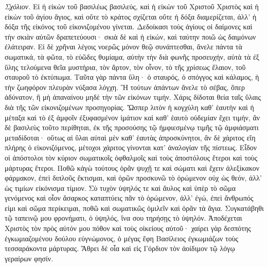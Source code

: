 \documentclass[10pt]{book}
\newcommand{\switchGreek}[1][]{\selectlanguage{polutonikogreek} \switchcolumn*[#1]}
\newcommand{\switchEnglish}{\selectlanguage{english} \switchcolumn}
\begin{document}
\begin{paracol}{2}
\switchGreek

\emph{Σχόλιον.} Εἰ ἡ εἰκὼν τοῦ βασιλέως βασιλεύς,
καὶ ἡ εἰκὼν τοῦ Χριστοῦ Χριστὸς
καὶ ἡ εἰκὼν τοῦ ἁγίου ἅγιος,
καὶ οὔτε τὸ κράτος σχίζεται οὔτε ἡ δόξα διαμερίζεται, ἀλλ’ ἡ
δόξα τῆς εἰκόνος τοῦ εἰκονιζομένου γίνεται. Δεδοίκασι τοὺς ἁγίους οἱ δαίμονες
καὶ τὴν σκιὰν αὐτῶν δραπετεύουσι· σκιὰ δὲ καὶ ἡ εἰκών, καὶ ταύτην ποιῶ ὡς
δαιμόνων ἐλάτειραν. Εἰ δὲ χρῆναι λέγοις νοερῶς μόνον θεῷ συνάπτεσθαι, ἄνελε
πάντα τὰ σωματικά, τὰ φῶτα, τὸ εὐῶδες θυμίαμα, αὐτὴν τὴν διὰ φωνῆς προσευχήν,
αὐτὰ τὰ ἐξ ὕλης τελούμενα θεῖα μυστήρια, τὸν ἄρτον, τὸν οἶνον, τὸ τῆς χρίσεως
ἔλαιον, τοῦ σταυροῦ τὸ ἐκτύπωμα. Ταῦτα γὰρ πάντα ὕλη· ὁ σταυρός, ὁ σπόγγος καὶ
κάλαμος, ἡ τὴν ζωηφόρον πλευρὰν νύξασα λόγχη. Ἢ τούτων ἁπάντων ἄνελε τὸ σέβας,
ὅπερ ἀδύνατον, ἢ μὴ ἀπαναίνου μηδὲ τὴν τῶν εἰκόνων τιμήν. Χάρις δίδοται θεία
ταῖς ὕλαις διὰ τῆς τῶν εἰκονιζομένων προσηγορίας. Ὥσπερ λιτὸν ἡ κογχύλη καθ’
ἑαυτὴν καὶ ἡ μέταξα καὶ τὸ ἐξ ἀμφοῖν ἐξυφασμένον ἱμάτιον καὶ καθ’ ἑαυτὸ
οὐδεμίαν ἔχει τιμήν, ἂν δὲ βασιλεὺς τοῦτο περίθηται, ἐκ τῆς προσούσης τῷ
ἠμφιεσμένῳ τιμῆς τῷ ἀμφιάσματι μεταδίδοται· οὕτως αἱ ὕλαι αὐταὶ μὲν καθ’
ἑαυτὰς ἀπροσκύνητοι, ἂν δὲ χάριτος εἴη πλήρης ὁ εἰκονιζόμενος, μέτοχοι χάριτος
γίνονται κατ’ ἀναλογίαν τῆς πίστεως. Εἶδον οἱ ἀπόστολοι τὸν κύριον σωματικοῖς
ὀφθαλμοῖς καὶ τοὺς ἀποστόλους ἕτεροι καὶ τοὺς μάρτυρας ἕτεροι. Ποθῶ κἀγὼ
τούτους ὁρᾶν ψυχῇ τε καὶ σώματι καὶ ἔχειν ἀλεξίκακον φάρμακον, ἐπεὶ διπλοῦς
ἔκτισμαι, καὶ ὁρῶν προσκυνῶ τὸ ὁρώμενον οὐχ ὡς θεόν, ἀλλ’ ὡς τιμίων εἰκόνισμα
τίμιον. Σὺ τυχὸν ὑψηλός τε καὶ ἄυλος καὶ ὑπὲρ τὸ σῶμα γενόμενος καὶ οἷον
ἄσαρκος καταπτύεις πᾶν τὸ ὁρώμενον, ἀλλ’ ἐγώ, ἐπεὶ ἄνθρωπός εἰμι καὶ σῶμα
περίκειμαι, ποθῶ καὶ σωματικῶς ὁμιλεῖν καὶ ὁρᾶν τὰ ἅγια. Συγκατάβηθι τῷ
ταπεινῷ μου φρονήματι, ὁ ὑψηλός, ἵνα σου τηρήσῃς τὸ ὑψηλόν. Ἀποδέχεται Χριστὸς
τὸν πρὸς αὐτόν μου πόθον καὶ τοὺς οἰκείους αὐτοῦ· χαίρει γὰρ δεσπότης
ἐγκωμιαζομένου δούλου εὐγνώμονος, ὁ μέγας ἔφη Βασίλειος ἐγκωμιάζων τοὺς
τεσσαράκοντα μάρτυρας. Ἄθρει δὲ οἷα καὶ εἰς Γόρδιον τὸν ἀοίδιμον τῷ λόγῳ
γεραίρων φησίν.

\switchEnglish


\end{paracol}
\end{document}
